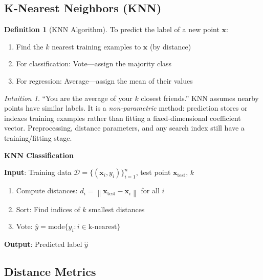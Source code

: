 \documentclass[11pt,twoside]{article}
\numberwithin{equation}{section}
\newcommand{\vect}[1]{\bm{#1}}
\newcommand{\norm}[1]{\left\lVert#1\right\rVert}
\theoremstyle{plain}
\theoremstyle{definition}
\newtheorem{definition}[theorem]{Definition}
\theoremstyle{remark}
\newtheorem{intuition}[theorem]{Intuition}
\begin{document}
\subsection{K-Nearest Neighbors (KNN)}

\begin{definition}[KNN Algorithm]
To predict the label of a new point $\vect{x}$:
\begin{enumerate}
\item Find the $k$ nearest training examples to $\vect{x}$ (by distance)
\item For classification: Vote---assign the majority class
\item For regression: Average---assign the mean of their values
\end{enumerate}
\end{definition}

\begin{intuition}
``You are the average of your $k$ closest friends.'' KNN assumes nearby points have similar labels. It is a \emph{non-parametric} method: prediction stores or indexes training examples rather than fitting a fixed-dimensional coefficient vector. Preprocessing, distance parameters, and any search index still have a training/fitting stage.
\end{intuition}

\begin{algorithmbox}
\textbf{KNN Classification}

\textbf{Input}: Training data $\mathcal{D} = \{(\vect{x}_i, y_i)\}_{i=1}^n$, test point $\vect{x}_{\text{test}}$, $k$

\begin{enumerate}
\item Compute distances: $d_i = \norm{\vect{x}_{\text{test}} - \vect{x}_i}$ for all $i$
\item Sort: Find indices of $k$ smallest distances
\item Vote: $\hat{y} = \text{mode}\{y_i : i \in \text{k-nearest}\}$
\end{enumerate}

\textbf{Output}: Predicted label $\hat{y}$
\end{algorithmbox}

\subsection{Distance Metrics}
\end{document}
